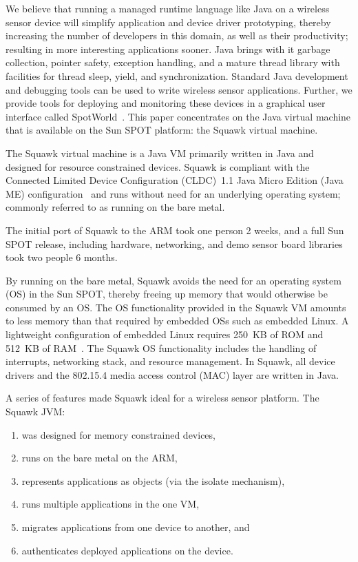 \documentclass{sigplanconf}
\begin{document}
We believe that running a managed runtime language like Java on a 
wireless sensor device will simplify application and device driver prototyping,
thereby increasing the number of developers in this domain, as well 
as their productivity; resulting in more interesting 
applications sooner.
Java brings with it garbage collection, pointer safety, exception 
handling, and a mature thread library with facilities for thread 
sleep, yield, and synchronization.  
Standard Java development and debugging tools can be used to write wireless 
sensor applications.
Further, we provide tools for deploying and monitoring these devices 
in a graphical user interface called SpotWorld~\cite{Smit05}. 
This paper concentrates on the Java virtual machine that is available
on the Sun SPOT platform: the Squawk virtual machine.

The Squawk virtual machine is a Java VM primarily written in Java and designed for
resource constrained devices.  Squawk is compliant with the 
Connected Limited Device Configuration (CLDC)~1.1 Java Micro Edition (Java ME)
configuration~\cite{CLDC11} and
runs without need for an underlying operating system; commonly referred to  
as running on the bare metal.

The initial port of Squawk to the ARM took one person 2 weeks, and a full Sun SPOT
release, including hardware, networking, and demo sensor
board libraries took two people 6 months.

By running on the bare metal, Squawk avoids the need for an
operating system (OS) in the Sun SPOT, thereby freeing up memory that would
otherwise be consumed by an OS.  
The OS functionality provided in the Squawk VM amounts to less memory 
than that required by embedded OSs such as embedded Linux. 
A lightweight configuration of embedded Linux requires 250~KB of ROM 
and 512~KB of RAM~\cite{ELinux}. 
The Squawk OS functionality includes the handling of interrupts, networking 
stack, and resource management. 
In Squawk, all device drivers and the 802.15.4 media access control (MAC) 
layer are written in Java.

A series of features made Squawk ideal for a wireless sensor platform.
The Squawk JVM:
\begin{enumerate}
\item was designed for memory constrained devices,
\item runs on the bare metal on the ARM,
\item represents applications as objects (via the isolate mechanism),
\item runs multiple applications in the one VM, 
\item migrates applications from one device to another, and 
\item authenticates deployed applications on the device.
\end{enumerate}
\end{document}
